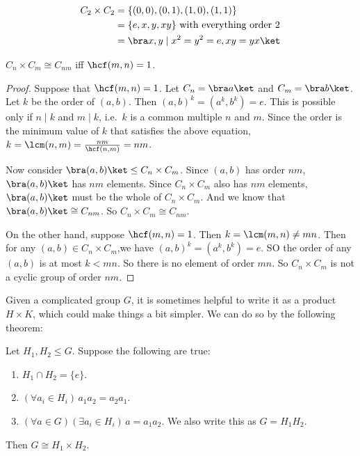 \documentclass[a4paper]{article}
\begin{document}
\begin{eg}
  \begin{align*}
    C_2\times C_2 &= \{(0, 0), (0, 1), (1, 0), (1, 1)\}\\
    &= \{e, x, y, xy\} \text{ with everything order 2}\\
    &= \bra x, y\mid x^2=y^2=e, xy = yx\ket
  \end{align*}
\end{eg}

\begin{prop}
  $C_n\times C_m\cong C_{nm}$ iff $\hcf(m, n) = 1$.
\end{prop}

\begin{proof}
  Suppose that $\hcf(m, n) = 1$. Let $C_n = \bra a\ket$ and $C_m = \bra b \ket$. Let $k$ be the order of $(a, b)$. Then $(a, b)^k = (a^k, b^k) = e$. This is possible only if $n \mid k$ and $m \mid k$, i.e.\ $k$ is a common multiple $n$ and $m$. Since the order is the minimum value of $k$ that satisfies the above equation, $k = \lcm(n, m) = \frac{nm}{\hcf(n, m)} = nm$.

  Now consider $\bra (a, b)\ket \leq C_n\times C_m$. Since $(a, b)$ has order $nm$, $\bra (a, b)\ket$ has $nm$ elements. Since $C_n\times C_m$ also has $nm$ elements, $\bra (a, b)\ket$ must be the whole of $C_n\times C_m$. And we know that $\bra (a, b)\ket\cong C_{nm}$. So $C_n\times C_m \cong C_{nm}$.

  On the other hand, suppose $\hcf(m, n) = 1$. Then $k = \lcm(m, n) \not= mn$. Then for any $(a, b)\in C_n \times C_m$,we have $(a, b)^k = (a^k, b^k) = e$. SO the order of any $(a, b)$ is at most $k < mn$. So there is no element of order $mn$. So $C_n\times C_m$ is not a cyclic group of order $nm$.
\end{proof}

Given a complicated group $G$, it is sometimes helpful to write it as a product $H\times K$, which could make things a bit simpler. We can do so by the following theorem:
\begin{prop}
  Let $H_1, H_2\leq G$. Suppose the following are true:
  \begin{enumerate}
    \item $H_1\cap H_2 = \{e\}$.
    \item $(\forall a_i\in H_i)\, a_1a_2=a_2a_1$.
    \item $(\forall a\in G)(\exists a_i\in H_i)\,a = a_1a_2$. We also write this as $G=H_1H_2$.
  \end{enumerate}
  Then $G\cong H_1\times H_2$.
\end{prop}
\end{document}
